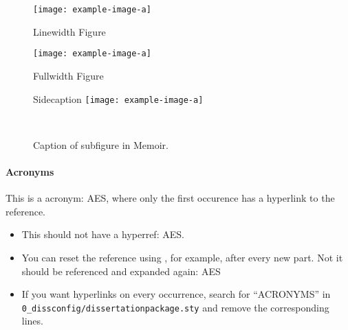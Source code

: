 \begin{figure}
	\texttt{[image: example-image-a]}
	\caption{Linewidth Figure}
	\label{LABEL}
\end{figure}


\begin{figure}
	\begin{fullwidth}
	\texttt{[image: example-image-a]}
	\caption{Fullwidth Figure}
	\label{LABEL}
	\end{fullwidth}
\end{figure}


\begin{figure}
	\begin{sidecaption}{Sidecaption}
		\texttt{[image: example-image-a]}
		\label{LABEL}
	\end{sidecaption}
\end{figure}

\begin{figure}
	\\%
    \caption{Caption of subfigure in Memoir.}
    \label{LABEL}
\end{figure}


\FloatBarrier
\paragraph{Acronyms}

This is a acronym: \gls{AES}, where only the first occurence has a hyperlink to the reference. 
\begin{itemize}
	\item This should not have a hyperref: \gls{AES}. 
	\item You can reset the reference using \detokenize{\glsresetall}, for example, after every new part. 
\glsresetall{} 
Not it should be referenced and expanded again: \gls{AES} 
	\item If you want hyperlinks on every occurrence, search for ``ACRONYMS'' in \lstinline{0_dissconfig/dissertationpackage.sty} and remove the corresponding lines. 
\end{itemize}







